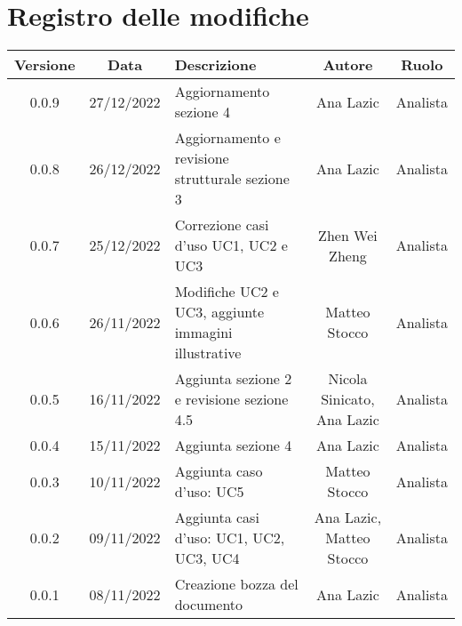 \section*{Registro delle modifiche}
\begin{center}
\renewcommand\tabularxcolumn[1]{>{\Centering}m{#1}}
\begin{tabularx}{\textwidth}{| c | c | X | c | c |} 
	\hline
	\textbf{Versione} & \textbf{Data} & \textbf{Descrizione} & \textbf{Autore} & \textbf{Ruolo}\\
     \hline
	0.0.9 & 27/12/2022 & Aggiornamento sezione 4 & Ana Lazic & Analista\\
    \hline
	0.0.8 & 26/12/2022 & Aggiornamento e revisione strutturale sezione 3 & Ana Lazic & Analista\\
	\hline
	0.0.7 & 25/12/2022 & Correzione casi d'uso UC1, UC2 e UC3 & Zhen Wei Zheng & Analista\\
	\hline
	0.0.6 & 26/11/2022 & Modifiche UC2 e UC3, aggiunte immagini illustrative & Matteo Stocco & Analista\\
	\hline
	0.0.5 & 16/11/2022	 & Aggiunta sezione 2 e revisione sezione 4.5 & Nicola Sinicato, Ana Lazic & Analista\\
	\hline
	0.0.4 & 15/11/2022	 & Aggiunta sezione 4 & Ana Lazic & Analista\\
	\hline
	0.0.3 & 10/11/2022 & Aggiunta caso d’uso: UC5 & Matteo Stocco & Analista\\
	\hline
	0.0.2 & 09/11/2022	 & Aggiunta casi d’uso: UC1, UC2, UC3, UC4 & Ana Lazic, Matteo Stocco & Analista\\
	\hline
	0.0.1 & 08/11/2022 & Creazione bozza del documento & Ana Lazic & Analista\\
	\hline
\end{tabularx}		
\end{center}
